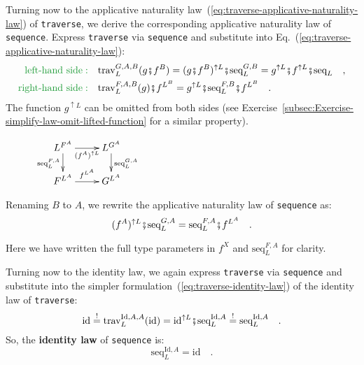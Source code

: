 Turning now to the applicative naturality law~(\ref{eq:traverse-applicative-naturality-law})
of \lstinline!traverse!, we derive the corresponding applicative
naturality law of \lstinline!sequence!. Express \lstinline!traverse!
via \lstinline!sequence! and substitute into Eq.~(\ref{eq:traverse-applicative-naturality-law}):
\begin{align*}
{\color{greenunder}\text{left-hand side}:}\quad & \text{trav}_{L}^{G,A,B}(g\bef f^{B})=(g\bef f^{B})^{\uparrow L}\bef\text{seq}_{L}^{G,B}=g^{\uparrow L}\bef f^{\uparrow L}\bef\text{seq}_{L}\quad,\\
{\color{greenunder}\text{right-hand side}:}\quad & \text{trav}_{L}^{F,A,B}(g)\bef f^{L^{B}}=g^{\uparrow L}\bef\text{seq}_{L}^{F,B}\bef f^{L^{B}}\quad.
\end{align*}
The function $g^{\uparrow L}$ can be omitted from both sides (see
Exercise~\ref{subsec:Exercise-simplify-law-omit-lifted-function}
for a similar property).

\begin{wrapfigure}{l}{0.22\columnwidth}%
\vspace{-1.1\baselineskip}
$\xymatrix{\xyScaleY{1.5pc}\xyScaleX{2.0pc}L^{F^{A}}\ar[d]\sb(0.45){\text{seq}_{L}^{F,A}}\ar[r]\sb(0.5){(f^{A})^{\uparrow L}} & L^{G^{A}}\ar[d]\sp(0.45){\text{seq}_{L}^{G,A}}\\
F^{L^{A}}\ar[r]\sp(0.5){f^{L^{A}}} & G^{L^{A}}
}
$\vspace{-0.5\baselineskip}
\end{wrapfigure}%

\noindent Renaming $B$ to $A$, we rewrite the applicative naturality
law
of \lstinline!sequence! as:
\[
(f^{A})^{\uparrow L}\bef\text{seq}_{L}^{G,A}=\text{seq}_{L}^{F,A}\bef f^{L^{A}}\quad.
\]

\noindent Here we have written the full type parameters in $f^{X}$
and $\text{seq}_{L}^{F,A}$ for clarity.

Turning now to the identity law, we again express \lstinline!traverse!
via \lstinline!sequence! and substitute into the simpler formulation~(\ref{eq:traverse-identity-law})
of the identity law of \lstinline!traverse!:
\[
\text{id}\overset{!}{=}\text{trav}_{L}^{\text{Id},A,A}(\text{id})=\text{id}^{\uparrow L}\bef\text{seq}_{L}^{\text{Id},A}\overset{!}{=}\text{seq}_{L}^{\text{Id},A}\quad.
\]
So, the \textbf{identity law} of \lstinline!sequence!
is:
\begin{equation}
\text{seq}_{L}^{\text{Id},A}=\text{id}\quad.\label{eq:identity-law-of-sequence}
\end{equation}

